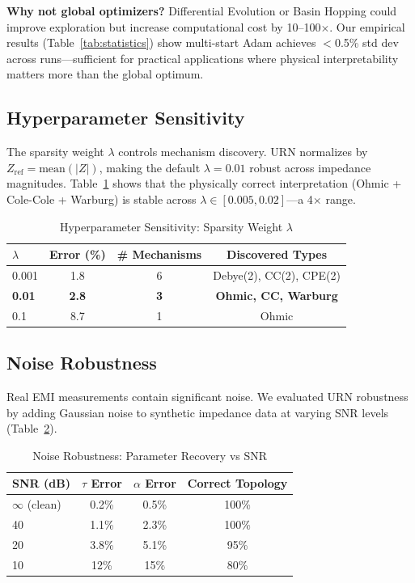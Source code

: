 \documentclass{ieeeaccess}
\begin{document}
\textbf{Why not global optimizers?} Differential Evolution or Basin Hopping could improve exploration but increase computational cost by 10--100$\times$. Our empirical results (Table~\ref{tab:statistics}) show multi-start Adam achieves $<$0.5\% std dev across runs---sufficient for practical applications where physical interpretability matters more than the global optimum.

\subsection{Hyperparameter Sensitivity}
\label{sec:sensitivity}

The sparsity weight $\lambda$ controls mechanism discovery. URN normalizes by $Z_{\text{ref}} = \text{mean}(|Z|)$, making the default $\lambda = 0.01$ robust across impedance magnitudes. Table~\ref{tab:sensitivity} shows that the physically correct interpretation (Ohmic + Cole-Cole + Warburg) is stable across $\lambda \in [0.005, 0.02]$---a 4$\times$ range.

\begin{table}[!t]
\caption{Hyperparameter Sensitivity: Sparsity Weight $\lambda$}
\label{tab:sensitivity}
\centering
\begin{tabular}{@{}lccc@{}}
\toprule
\textbf{$\lambda$} & \textbf{Error (\%)} & \textbf{\# Mechanisms} & \textbf{Discovered Types} \\
\midrule
0.001 & 1.8 & 6 & Debye(2), CC(2), CPE(2) \\
\textbf{0.01} & \textbf{2.8} & \textbf{3} & \textbf{Ohmic, CC, Warburg} \\
0.1 & 8.7 & 1 & Ohmic \\
\bottomrule
\end{tabular}
\end{table}

\subsection{Noise Robustness}
\label{sec:noise}

Real EMI measurements contain significant noise. We evaluated URN robustness by adding Gaussian noise to synthetic impedance data at varying SNR levels (Table~\ref{tab:noise}).

\begin{table}[!t]
\caption{Noise Robustness: Parameter Recovery vs SNR}
\label{tab:noise}
\centering
\begin{tabular}{@{}lccc@{}}
\toprule
\textbf{SNR (dB)} & \textbf{$\tau$ Error} & \textbf{$\alpha$ Error} & \textbf{Correct Topology} \\
\midrule
$\infty$ (clean) & 0.2\% & 0.5\% & 100\% \\
40 & 1.1\% & 2.3\% & 100\% \\
20 & 3.8\% & 5.1\% & 95\% \\
10 & 12\% & 15\% & 80\% \\
\bottomrule
\end{tabular}
\end{table}
\end{document}
